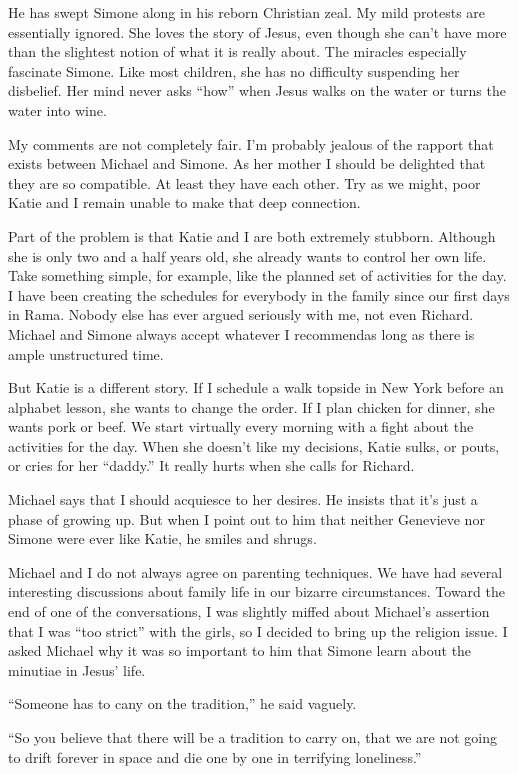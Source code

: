 \documentclass[]{article}
\begin{document}
He has swept Simone along in his reborn Christian zeal. My mild protests are essentially ignored. She loves the story of Jesus, even though she can’t have more than the slightest notion of what it is really about. The miracles especially fascinate Simone. Like most children, she has no difficulty suspending her disbelief. Her mind never asks “how” when Jesus walks on the water or turns the water into wine.

My comments are not completely fair. I’m probably jealous of the rapport that exists between Michael and Simone. As her mother I should be delighted that they are so compatible. At least they have each other. Try as we might, poor Katie and I remain unable to make that deep connection.

Part of the problem is that Katie and I are both extremely stubborn. Although she is only two and a half years old, she already wants to control her own life. Take something simple, for example, like the planned set of activities for the day. I have been creating the schedules for everybody in the family since our first days in Rama. Nobody else has ever argued seriously with me, not even Richard. Michael and Simone always accept whatever I recommendas long as there is ample unstructured time.

But Katie is a different story. If I schedule a walk topside in New York before an alphabet lesson, she wants to change the order. If I plan chicken for dinner, she wants pork or beef. We start virtually every morning with a fight about the activities for the day. When she doesn’t like my decisions, Katie sulks, or pouts, or cries for her “daddy.” It really hurts when she calls for Richard.

Michael says that I should acquiesce to her desires. He insists that it’s just a phase of growing up. But when I point out to him that neither Genevieve nor Simone were ever like Katie, he smiles and shrugs.

Michael and I do not always agree on parenting techniques. We have had several interesting discussions about family life in our bizarre circumstances. Toward the end of one of the conversations, I was slightly miffed about Michael’s assertion that I was “too strict” with the girls, so I decided to bring up the religion issue. I asked Michael why it was so important to him that Simone learn about the minutiae in Jesus’ life.

“Someone has to cany on the tradition,” he said vaguely.

“So you believe that there will be a tradition to carry on, that we are not going to drift forever in space and die one by one in terrifying loneliness.”
\end{document}
